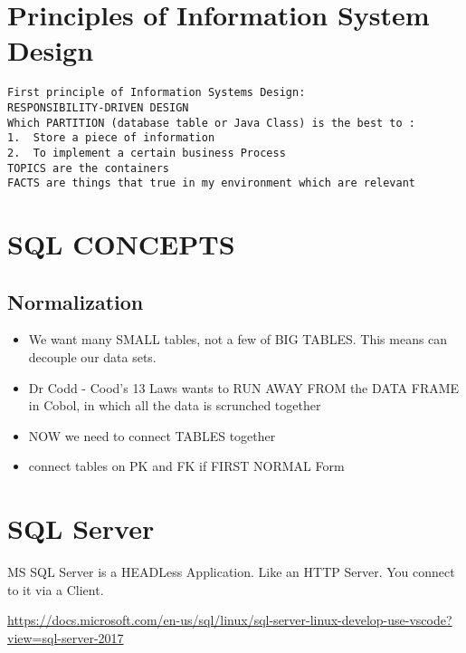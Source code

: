 \newpage
\section {Principles of Information System Design}

\begin{verbatim}
First principle of Information Systems Design:
RESPONSIBILITY-DRIVEN DESIGN
Which PARTITION (database table or Java Class) is the best to :
1.	Store a piece of information
2.	To implement a certain business Process
TOPICS are the containers
FACTS are things that true in my environment which are relevant
\end{verbatim}

\section  * {SQL CONCEPTS}
	\subsection  * {Normalization}
	
	\begin{itemize}
	    \item We want many SMALL tables, not a few of BIG TABLES. This means can decouple our data sets.
	    \item Dr Codd - Cood's 13 Laws wants to RUN AWAY FROM the DATA FRAME in Cobol, in which all the data is scrunched together
	    \item NOW we need to connect TABLES together
	    \item connect tables on PK and FK if FIRST NORMAL Form

	\end{itemize}
		
\section {SQL Server}		
MS SQL Server is a HEADLess Application. Like an HTTP Server. You connect to it via a Client.		
			
\url{https://docs.microsoft.com/en-us/sql/linux/sql-server-linux-develop-use-vscode?view=sql-server-2017}	